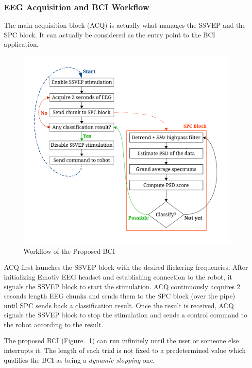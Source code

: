 \documentclass[12pt]{article}
\newcommand\mysubsubsection[1]{\subsubsection{#1}}
\numberwithin{equation}{section}
\numberwithin{figure}{section}
\numberwithin{table}{section}
\begin{document}
\mysubsubsection{EEG Acquisition and BCI Workflow}
\par{
    The main acquisition block (ACQ) is actually what manages the SSVEP and the SPC block.
    It can actually be considered as the entry point to the BCI application.
    \begin{figure}[ht]
        \centering
        \includegraphics[scale=0.7]{images/workflow2}
        \caption{Workflow of the Proposed BCI}
        \label{fig:workflow}
    \end{figure}
}
\par{
    ACQ first launches the SSVEP block with the desired flickering frequencies.
    After initializing Emotiv EEG headset and establishing connection to the robot,
    it signals the SSVEP block to start the stimulation.
    ACQ continuously acquires 2 seconds length EEG chunks
    and sends them to the SPC block (over the pipe) until SPC sends back a classification
    result. Once the result is received, ACQ signals the SSVEP block to stop the
    stimulation and sends a control command to the robot according to the result.
}
\par{
    The proposed BCI (Figure ~\ref{fig:workflow}) can run infinitely until the user or someone
    else interrupts it. The length of each trial is not fixed to a predetermined
    value which qualifies the BCI as being a \emph{dynamic stopping} one.
}
\end{document}
